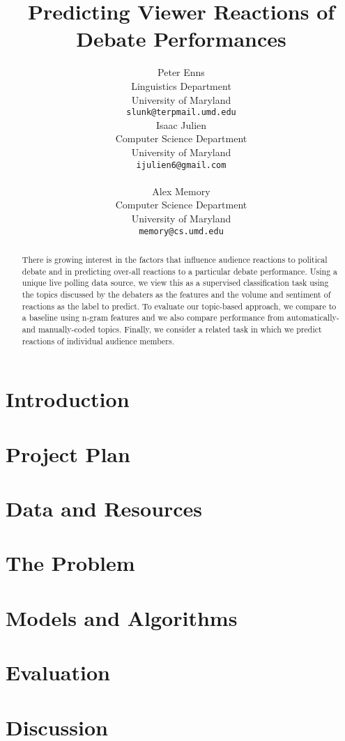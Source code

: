 \documentclass[11pt]{article}
\title{Predicting Viewer Reactions of Debate Performances}
\author{Peter Enns \\
  Linguistics Department \\
  University of Maryland \\
  {\tt slunk@terpmail.umd.edu} \\\And
  Isaac Julien \\
  Computer Science Department \\
  University of Maryland \\
  {\tt ijulien6@gmail.com} \\ \\\And
  Alex Memory \\
  Computer Science Department \\
  University of Maryland \\
  {\tt memory@cs.umd.edu} \\
  }
\date{}
\begin{document}
\maketitle
\begin{abstract}
  There is growing interest in the factors that influence audience reactions to political debate and in predicting over-all reactions to a particular debate performance.  Using a unique live polling data source, we view this as a supervised classification task using the topics discussed by the debaters as the features and the volume and sentiment of reactions as the label to predict.  To evaluate our topic-based approach, we compare to a baseline using n-gram features and we also compare performance from automatically- and manually-coded topics.  Finally, we consider a related task in which we predict reactions of individual audience members.
\end{abstract}

\section{Introduction}


\section{Project Plan}


\section{Data and Resources}


\section{The Problem}


\section{Models and Algorithms}


\section{Evaluation}
\label{sec:evaluation}


\section{Discussion}

\end{document}
